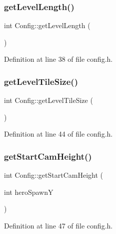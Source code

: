 \subsubsection{\texorpdfstring{get\+Level\+Length()}{getLevelLength()}}
{\footnotesize\ttfamily int Config\+::get\+Level\+Length (\begin{DoxyParamCaption}{ }\end{DoxyParamCaption})\hspace{0.3cm}{\ttfamily [inline]}}



Definition at line 38 of file config.\+h.

\hypertarget{class_config_a89ab75acd03f4f6c051941e0c3e1f35d}{}\label{class_config_a89ab75acd03f4f6c051941e0c3e1f35d} 
\subsubsection{\texorpdfstring{get\+Level\+Tile\+Size()}{getLevelTileSize()}}
{\footnotesize\ttfamily int Config\+::get\+Level\+Tile\+Size (\begin{DoxyParamCaption}{ }\end{DoxyParamCaption})\hspace{0.3cm}{\ttfamily [inline]}}



Definition at line 44 of file config.\+h.

\hypertarget{class_config_aba1369c97001523c4206a47da0ce1361}{}\label{class_config_aba1369c97001523c4206a47da0ce1361} 
\subsubsection{\texorpdfstring{get\+Start\+Cam\+Height()}{getStartCamHeight()}}
{\footnotesize\ttfamily int Config\+::get\+Start\+Cam\+Height (\begin{DoxyParamCaption}\item[{int}]{hero\+SpawnY }\end{DoxyParamCaption})\hspace{0.3cm}{\ttfamily [inline]}}



Definition at line 47 of file config.\+h.

